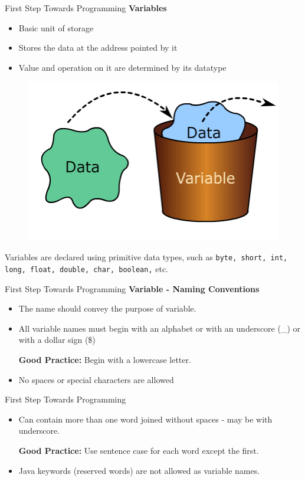 \documentclass[14pt]{beamer}
\begin{document}
\begin{frame}{First Step Towards Programming}
 \textbf{Variables}
 \small
 \begin{itemize}
  \item Basic unit of storage
  \item Stores the data at the address pointed by it
  \item Value and operation on it are determined by its datatype
 \end{itemize}
 \begin{figure}[H]
\begin{center}
 \includegraphics[scale=.15]{variables-storage.png}
\end{center}
\end{figure}
Variables are declared using primitive data types, such as \lstinline!byte, short, int, long, float, double, char, boolean,! etc.    
\end{frame}

\begin{frame}{First Step Towards Programming}
 \textbf{Variable - Naming Conventions }
 \begin{itemize}
  \item The name should convey the purpose of variable.
  \item All variable names must begin with an alphabet or with an underscore (\_) or with a dollar sign (\$) 
  
  \textbf{Good Practice:} Begin with a lowercase letter.
  \item No spaces or special characters are allowed
  \end{itemize}
\end{frame}

\begin{frame}{First Step Towards Programming}
  \begin{itemize}
  \item Can contain more than one word joined without spaces - may be with underscore.
 
 \textbf{Good Practice:} Use sentence case for each word except the first. 
  \item Java keywords (reserved words) are not allowed as variable names.
 
        
\end{itemize}
\end{frame}
\end{document}
